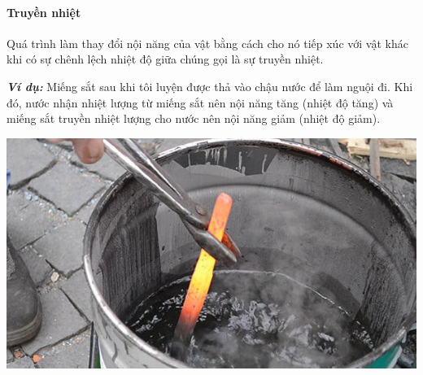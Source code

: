 \paragraph{Truyền nhiệt}
\begin{boxdn}
	Quá trình làm thay đổi nội năng của vật bằng cách cho nó tiếp xúc với vật khác khi có sự chênh lệch nhiệt độ giữa chúng gọi là sự truyền nhiệt.
\end{boxdn}
\begin{boxvidu}
	\textbf{\textit{Ví dụ:}} Miếng sắt sau khi tôi luyện được thả vào chậu nước để làm nguội đi. Khi đó, nước nhận nhiệt lượng từ miếng sắt nên nội năng tăng (nhiệt độ tăng) và miếng sắt truyền nhiệt lượng cho nước nên nội năng giảm (nhiệt độ giảm).
\end{boxvidu}
\begin{center}
	\includegraphics[width=0.3\linewidth]{figs/VN12-Y24-PH-SYL-003-2}
\end{center}

